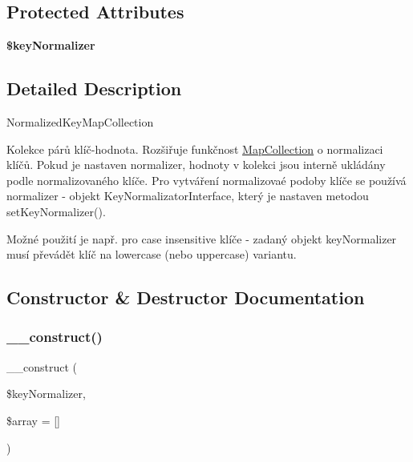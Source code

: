 \subsection*{Protected Attributes}
\begin{DoxyCompactItemize}
\item 
\mbox{\label{class_pes_1_1_collection_1_1_key_normalized_map_collection_ae745d34526e0a45355cf9b918dc53c9c}} 
{\bfseries \$key\+Normalizer}
\end{DoxyCompactItemize}


\subsection{Detailed Description}
Normalized\+Key\+Map\+Collection

Kolekce párů klíč-\/hodnota. Rozšiřuje funkčnost \mbox{\hyperlink{class_pes_1_1_collection_1_1_map_collection}{Map\+Collection}} o normalizaci klíčů. Pokud je nastaven normalizer, hodnoty v kolekci jsou interně ukládány podle normalizovaného klíče. Pro vytváření normalizovaé podoby klíče se používá normalizer -\/ objekt Key\+Normalizator\+Interface, který je nastaven metodou set\+Key\+Normalizer().

Možné použití je např. pro case insensitive klíče -\/ zadaný objekt key\+Normalizer musí převádět klíč na lowercase (nebo uppercase) variantu. 

\subsection{Constructor \& Destructor Documentation}
\mbox{\label{class_pes_1_1_collection_1_1_key_normalized_map_collection_a8e87b95407cbad036c407b56eebd35c9}} 
\subsubsection{\texorpdfstring{\+\_\+\+\_\+construct()}{\_\_construct()}}
{\footnotesize\ttfamily \+\_\+\+\_\+construct (\begin{DoxyParamCaption}\item[{\mbox{\hyperlink{interface_pes_1_1_collection_1_1_normalizer_1_1_key_normalizer_interface}{Key\+Normalizer\+Interface}}}]{\$key\+Normalizer,  }\item[{array}]{\$array = {\ttfamily \mbox{[}\mbox{]}} }\end{DoxyParamCaption})}

